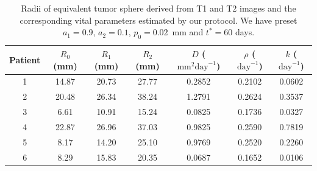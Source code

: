 \documentclass{aims}
\numberwithin{equation}{section}
\begin{document}
\begin{table}
\begin{center}
\begin{tabular}{ccccccc} \hline
Patient & $R_0$ (mm) & $R_1$ (mm) & $R_2$ (mm) & $D$ ($\mbox{mm}^{2}\mbox{day}^{-1}$)
& $\rho$ ($\mbox{day}^{-1}$) & $k$ ($\mbox{day}^{-1}$) \\ \hline
1 & 14.87 & 20.73 & 27.77 & 0.2852 & 0.2102 & 0.0602 \\
2 & 20.48 & 26.34 & 38.24 & 1.2791 & 0.2624 & 0.3537 \\
3 & 6.61  & 10.91 & 15.24 & 0.0825 & 0.1736 & 0.0327 \\
4 & 22.87 & 26.96 & 37.03 & 0.9825 & 0.2590 & 0.7819 \\
5 & 8.17  & 14.20 & 25.10 & 0.9769 & 0.2520 & 0.2260 \\
6 & 8.29  & 15.83 & 20.35 & 0.0687 & 0.1652 & 0.0106 \\ \hline
\end{tabular}
\end{center}
\caption{Radii of equivalent tumor sphere derived from T1 and T2 images and the
corresponding vital parameters estimated by our protocol. We have preset $a_1=0.9$,
$a_2=0.1$, $p_0=0.02$~mm and $t^*=60$ days.}
\label{tab:Patient-data-para} 
\end{table}
\end{document}

